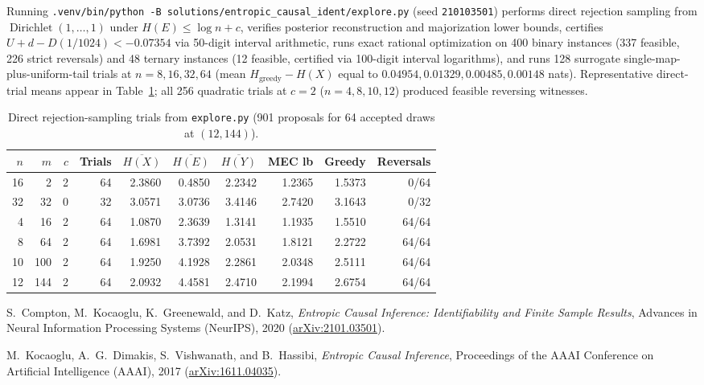 \documentclass[11pt]{article}
\theoremstyle{plain}
\theoremstyle{definition}
\theoremstyle{remark}
\DeclareMathOperator{\Dir}{Dirichlet}
\begin{document}
Running \texttt{.venv/bin/python -B solutions/entropic\_causal\_ident/explore.py} (seed \texttt{210103501}) performs direct rejection sampling from $\Dir(1,\dots,1)$ under $H(E) \le \log n + c$, verifies posterior reconstruction and majorization lower bounds, certifies $U + d - D(1/1024) < -0.07354$ via 50-digit interval arithmetic, runs exact rational optimization on 400 binary instances (337 feasible, 226 strict reversals) and 48 ternary instances (12 feasible, certified via 100-digit interval logarithms), and runs 128 surrogate single-map-plus-uniform-tail trials at $n = 8, 16, 32, 64$ (mean $H_{\mathrm{greedy}} - H(X)$ equal to $0.04954, 0.01329, 0.00485, 0.00148$ nats). Representative direct-trial means appear in Table~\ref{tab:direct}; all 256 quadratic trials at $c = 2$ ($n = 4, 8, 10, 12$) produced feasible reversing witnesses.

\begin{table}[htbp]
\centering
\small
\begin{tabular}{@{}rrrrrrrrrr@{}}
\toprule
$n$ & $m$ & $c$ & Trials & $\overline{H(X)}$ & $\overline{H(E)}$ & $\overline{H(Y)}$ & MEC lb & Greedy & Reversals \\
\midrule
16 &   2 & 2 & 64 & 2.3860 & 0.4850 & 2.2342 & 1.2365 & 1.5373 &  0/64 \\
32 &  32 & 0 & 32 & 3.0571 & 3.0736 & 3.4146 & 2.7420 & 3.1643 &  0/32 \\
 4 &  16 & 2 & 64 & 1.0870 & 2.3639 & 1.3141 & 1.1935 & 1.5510 & 64/64 \\
 8 &  64 & 2 & 64 & 1.6981 & 3.7392 & 2.0531 & 1.8121 & 2.2722 & 64/64 \\
10 & 100 & 2 & 64 & 1.9250 & 4.1928 & 2.2861 & 2.0348 & 2.5111 & 64/64 \\
12 & 144 & 2 & 64 & 2.0932 & 4.4581 & 2.4710 & 2.1994 & 2.6754 & 64/64 \\
\bottomrule
\end{tabular}
\caption{Direct rejection-sampling trials from \texttt{explore.py} (901 proposals for 64 accepted draws at $(12, 144)$).}
\label{tab:direct}
\end{table}

\begin{thebibliography}{9}

S.~Compton, M.~Kocaoglu, K.~Greenewald, and D.~Katz,
\emph{Entropic Causal Inference: Identifiability and Finite Sample Results},
Advances in Neural Information Processing Systems (NeurIPS), 2020 (\href{https://arxiv.org/abs/2101.03501}{arXiv:2101.03501}).

M.~Kocaoglu, A.~G.~Dimakis, S.~Vishwanath, and B.~Hassibi,
\emph{Entropic Causal Inference},
Proceedings of the AAAI Conference on Artificial Intelligence (AAAI), 2017 (\href{https://arxiv.org/abs/1611.04035}{arXiv:1611.04035}).

\end{thebibliography}
\end{document}
